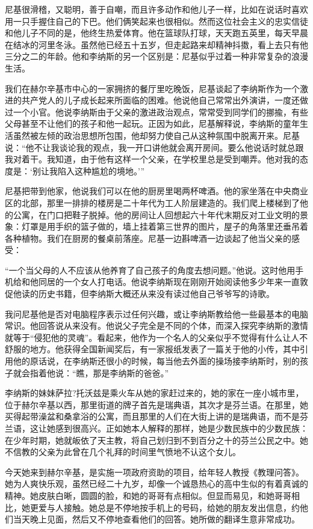 尼基很滑稽，又聪明，善于自嘲，而且许多动作和他儿子一样，比如在说话时喜欢用一只手握住自己的下巴。他们俩笑起来也很相似。然而这位社会主义的忠实信徒和他儿子不同的是，他终生热爱体育。他在篮球队打球，天天跑五英里，每天早晨在结冰的河里冬泳。虽然他已经五十五岁，但走起路来却精神抖擞，看上去只有他三分之二的年龄。他和李纳斯的另一个区别是：尼基似乎过着一种非常复杂的浪漫生活。

我们在赫尔辛基市中心的一家拥挤的餐厅里吃晚饭，尼基谈起了李纳斯作为一个激进的共产党人的儿子成长起来所面临的困难。他说他自己常常出外演讲，一度还做过一个小官。他说李纳斯由于父亲的激进政治观点，常常受到同学们的挪揄，有些父母甚至不让他们的孩子和他一起玩。正因为如此，尼基解释说，李纳斯的童年生活虽然被左倾的政治思想所包围，他却努力使自己从这种氛围中脱离开来。尼基说：“他不让我谈论我的观点，我一开口讲他就会离开房间。要么他说话时就总跟我对着干。我知道，由于他有这样一个父亲，在学校里总是受到嘲弄。他对我的态度是：‘别让我陷入这种尴尬的境地。’”

尼基把带到他家，他说我们可以在他的厨房里喝两杯啤酒。他的家坐落在中央商业区的北部，那里一排排的楼房是二十年代为工人阶层建造的。我们爬上楼梯到了他的公寓，在门口把鞋子脱掉。他的房间让人回想起六十年代末期反对工业文明的景象：灯罩是用手织的篮子做的，墙上挂着第三世界的图片，屋子的角落里还垂吊着各种植物。我们在厨房的餐桌前落座。尼基一边斟啤酒一边谈起了他当父亲的感受：

“一个当父母的人不应该从他养育了自己孩子的角度去想问题。”他说。这时他用手机给和他同居的一个女人打电话。他说李纳斯现在刚刚开始阅读他多少年来一直敦促他读的历史书籍，但李纳斯大概还从来没有读过他自己爷爷写的诗歌。

我问尼基他是否对电脑程序表示过任何兴趣，或让李纳斯教给他一些最基本的电脑常识。他回答说从来没有。他说父子完全是不同的个体，而深入探究李纳斯的激情就等于“侵犯他的灵魂”。看起来，他作为一个名人的父亲似乎不觉得有什么让人不舒服的地方。他获得全国新闻奖后，有一家报纸发表了一篇关于他的小传，其中引用他的原话说，在李纳斯还很小的时候，每当他去外面的操场接李纳斯时，别的孩子就会指着他说：“瞧，那是李纳斯的爸爸。”

李纳斯的妹妹萨拉?托沃兹是乘火车从她的家赶过来的，她的家在一座小城市里，位于赫尔辛基以西，那里街道的牌子首先是瑞典语，其次才是芬兰语。在那里，她买得起带澡盆和桑拿浴的公寓，而且那里的人们在大街上讲的是瑞典语，而不是芬兰语，这让她感到很高兴。正如她本人解释的那样，她是少数民族中的少数民族：在少年时期，她就皈依了天主教，将自己划归到不到百分之十的芬兰公民之中。她不信教的父亲为此曾在几个礼拜的时间里气愤地不认这个女儿。

今天她来到赫尔辛基，是实施一项政府资助的项目，给年轻人教授《教理问答》。她为人爽快乐观，虽然已经二十九岁，却像一个诚恳热心的高中生似的有着真诚的精神。她皮肤白晰，圆圆的脸，和她的哥哥有点相似。但显而易见，和她哥哥相比，她更爱与人接触。她总是不停地按手机上的号码，给她的朋友发出信息，约他们当天晚上见面，然后又不停地查看他们的回答。她所做的翻译生意非常成功。

